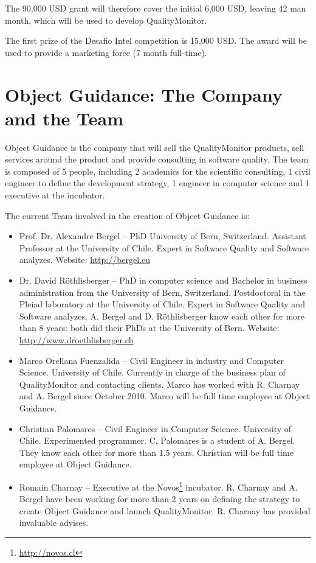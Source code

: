 \documentclass[runningheads]{llncs}
\newcommand{\seclabel}[1]{\label{sec:#1}}
\begin{document}
The 90,000 USD grant will therefore cover the initial 6,000 USD, leaving 42 man month, which will be used to develop QualityMonitor. 

The first prize of the Desafio Intel competition is 15,000 USD. The award will be used to provide a marketing force (7 month full-time).

\section{Object Guidance: The Company and the Team} \seclabel{team}

Object Guidance is the company that will sell the QualityMonitor products, sell services around the product and provide consulting in software quality. The team is composed of 5 people, including 2 academics for the scientific consulting, 1 civil engineer to define the development strategy, 1 engineer in computer science and 1 executive at the incubator.

The current Team involved in the creation of Object Guidance is:
\begin{itemize}
\item Prof. Dr. Alexandre Bergel -- PhD University of Bern, Switzerland. Assistant Professor at the University of Chile. Expert in Software Quality and Software analyzes. Website: \url{http://bergel.eu}
\item Dr. David R\"othlisberger -- PhD in computer science and Bachelor in business administration from the University of Bern, Switzerland. Postdoctoral in the Pleiad laboratory at the University of Chile. Expert in Software Quality and Software analyzes. A. Bergel and D. R\"othlisberger know each other for more than 8 years: both did their PhDs at the University of Bern. Website: \url{http://www.droethlisberger.ch}
\item Marco Orellana Fuenzalida -- Civil Engineer in industry and Computer Science. University of Chile. Currently in charge of the business plan of QualityMonitor and contacting clients. Marco has worked with R. Charnay and A. Bergel since October 2010. Marco will be full time employee at Object Guidance.
\item Christian Palomares -- Civil Engineer in Computer Science. University of Chile. Experimented programmer. C. Palomares is a student of A. Bergel. They know each other for more than 1.5 years. Christian will be full time employee at Object Guidance.
\item Romain Charnay -- Executive at the Novos\footnote{\url{http://novos.cl}} incubator. R. Charnay and A. Bergel have been working for more than 2 years on defining the strategy to create Object Guidance and launch QualityMonitor. R. Charnay has provided invaluable advises.
\end{itemize}
\end{document}
